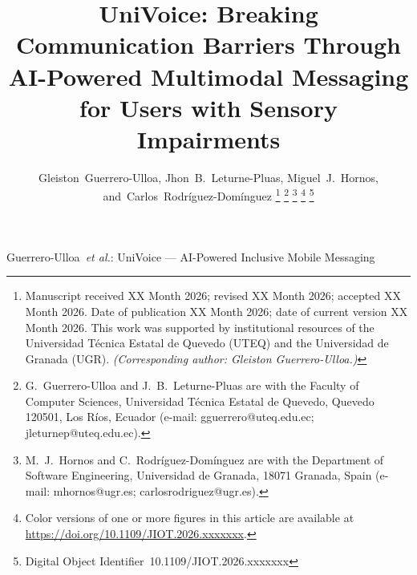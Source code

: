 \documentclass[journal]{IEEEtran}
\begin{document}
	
	\title{UniVoice: Breaking Communication Barriers Through AI-Powered Multimodal Messaging for Users with Sensory Impairments}
	
	\author{Gleiston~Guerrero-Ulloa,%
		Jhon~B.~Leturne-Pluas,%
		Miguel~J.~Hornos,%
		and~Carlos~Rodr\'iguez-Dom\'inguez%
		\thanks{Manuscript received XX Month 2026; revised XX Month 2026;
			accepted XX Month 2026. Date of publication XX Month 2026;
			date of current version XX Month 2026.
			This work was supported by institutional resources of the
			Universidad T\'ecnica Estatal de Quevedo (UTEQ) and the
			Universidad de Granada (UGR).
			\textit{(Corresponding author: Gleiston Guerrero-Ulloa.)}}%
		\thanks{G.~Guerrero-Ulloa and J.~B.~Leturne-Pluas are with the
			Faculty of Computer Sciences, Universidad T\'ecnica Estatal de
			Quevedo, Quevedo 120501, Los R\'ios, Ecuador (e-mail:
			gguerrero@uteq.edu.ec; jleturnep@uteq.edu.ec).}%
		\thanks{M.~J.~Hornos and C.~Rodr\'iguez-Dom\'inguez are with the
			Department of Software Engineering, Universidad de Granada,
			18071 Granada, Spain (e-mail: mhornos@ugr.es;
			carlosrodriguez@ugr.es).}%
		\thanks{Color versions of one or more figures in this article are
			available at \protect\url{https://doi.org/10.1109/JIOT.2026.xxxxxxx}.}%
		\thanks{Digital Object Identifier~10.1109/JIOT.2026.xxxxxxx}}
	
	{Guerrero-Ulloa~\MakeLowercase{\textit{et al.}}:
		UniVoice --- AI-Powered Inclusive Mobile Messaging}
	
	\maketitle
	
\end{document}
